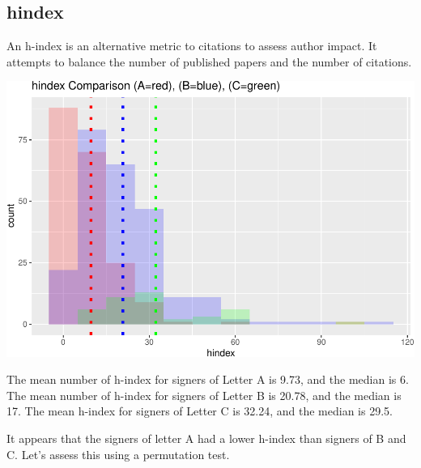 \documentclass[]{article}
\begin{document}
\hypertarget{hindex}{%
\subsection{hindex}\label{hindex}}

An h-index is an alternative metric to citations to assess author
impact. It attempts to balance the number of published papers and the
number of citations.

\includegraphics{final_files/figure-latex/unnamed-chunk-45-1.pdf}

The mean number of h-index for signers of Letter A is 9.73, and the
median is 6. The mean number of h-index for signers of Letter B is
20.78, and the median is 17. The mean h-index for signers of Letter C is
32.24, and the median is 29.5.

It appears that the signers of letter A had a lower h-index than signers
of B and C. Let's assess this using a permutation test.
\end{document}
